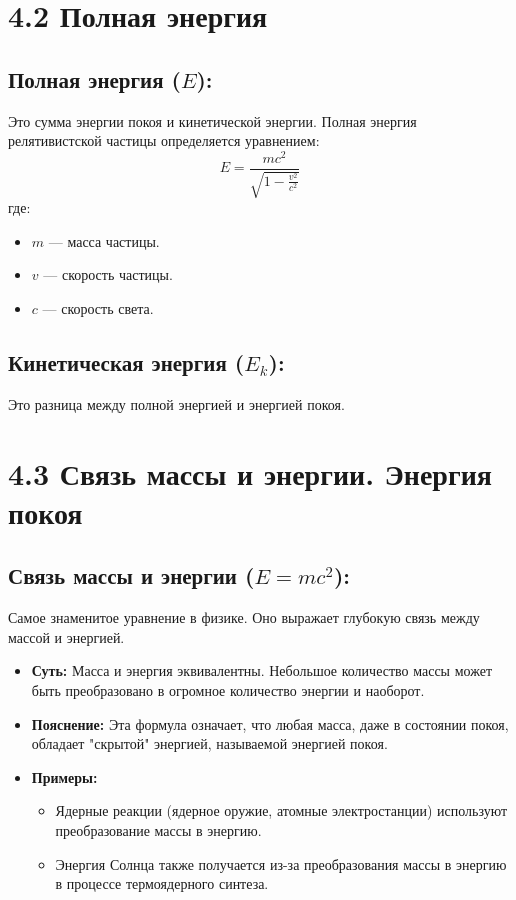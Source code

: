 \documentclass[a4paper,12pt]{article}
\begin{document}
\section*{4.2 Полная энергия}
\vspace{-9pt}
\subsection*{Полная энергия ($E$):}
\vspace{-3pt}
Это сумма энергии покоя и кинетической энергии. Полная энергия релятивистской частицы определяется уравнением:
\vspace{-0.05em}
$$ E = \frac{mc^2}{\sqrt{1 - \frac{v^2}{c^2}}} $$
где:
\begin{itemize}
    \item $m$ — масса частицы.
    \item $v$ — скорость частицы.
    \item $c$ — скорость света.
\end{itemize}

\vspace{-9pt}
\subsection*{Кинетическая энергия ($E_k$):}
\vspace{-3pt}
Это разница между полной энергией и энергией покоя.


\section*{4.3 Связь массы и энергии. Энергия покоя}
\vspace{-9pt}
\subsection*{Связь массы и энергии ($E = mc^2$):}
\vspace{-3pt}
Самое знаменитое уравнение в физике. Оно выражает глубокую связь между массой и энергией.
\begin{itemize}
    \item \textbf{Суть:} Масса и энергия эквивалентны. Небольшое количество массы может быть преобразовано в огромное количество энергии и наоборот.
    \item \textbf{Пояснение:} Эта формула означает, что любая масса, даже в состоянии покоя, обладает "скрытой" энергией, называемой энергией покоя.
    \item \textbf{Примеры:}
    \begin{itemize}
        \item Ядерные реакции (ядерное оружие, атомные электростанции) используют преобразование массы в энергию.
        \item Энергия Солнца также получается из-за преобразования массы в энергию в процессе термоядерного синтеза.
    \end{itemize}
\end{itemize}
\end{document}
